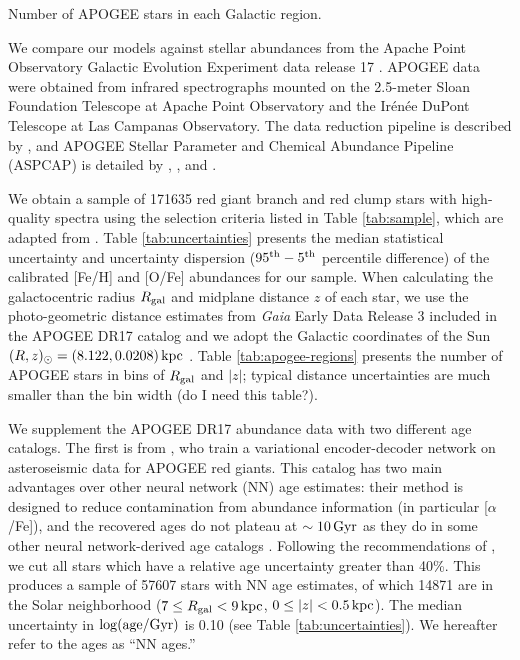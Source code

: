\documentclass[twocolumn,twocolappendix,linenumbers]{aastex631}
\newcommand{\todo}[1]{{\color{red}#1}}
\newcommand{\kpc}{\,{\rm kpc}}
\begin{document}
\begin{table}
\centering
\caption{Number of APOGEE stars in each Galactic region.}
\label{tab:apogee-regions}

\end{table}

We compare our models against stellar abundances from the Apache Point Observatory Galactic Evolution Experiment \citep[APOGEE;][]{majewski_apache_2017} data release 17 \citep[DR17;][]{abdurrouf_seventeenth_2022}. APOGEE data were obtained from infrared spectrographs \citep{wilson_apache_2019} mounted on the 2.5-meter Sloan Foundation Telescope \citep{gunn_25_2006} at Apache Point Observatory and the Ir{\'e}n{\'e}e DuPont Telescope \citep{bowen_optical_1973} at Las Campanas Observatory. The data reduction pipeline is described by \citet{nidever_data_2015}, and APOGEE Stellar Parameter and Chemical Abundance Pipeline (ASPCAP) is detailed by \citet{holtzman_abundances_2015}, \citet{garcia_perez_aspcap_2016}, and \citet{jonsson_apogee_2020}.

We obtain a sample of \num{171635} red giant branch and red clump stars with high-quality spectra using the selection criteria listed in Table \ref{tab:sample}, which are adapted from \citet{hayden_chemical_2015}. Table \ref{tab:uncertainties} presents the median statistical uncertainty and uncertainty dispersion ($95^{\rm th} - 5^{\rm th}$ percentile difference) of the calibrated [Fe/H] and [O/Fe] abundances for our sample. When calculating the galactocentric radius $R_{\rm gal}$ and midplane distance $z$ of each star, we use the \citet{bailer-jones_estimating_2021} photo-geometric distance estimates from {\it Gaia} Early Data Release 3 \citep{gaia_collaboration_gaia_2016,gaia_collaboration_gaia_2021} included in the APOGEE DR17 catalog and we adopt the Galactic coordinates of the Sun $(R,z)_\odot=(8.122, 0.0208)\kpc$ \citep{gravity_collaboration_detection_2018,bennett_vertical_2019}. Table \ref{tab:apogee-regions} presents the number of APOGEE stars in bins of $R_{\rm gal}$ and $|z|$; typical distance uncertainties are much smaller than the bin width \todo{(do I need this table?)}.

We supplement the APOGEE DR17 abundance data with two different age catalogs. The first is from \citet{leung_variational_2023}, who train a variational encoder-decoder network on asteroseismic data for APOGEE red giants. This catalog has two main advantages over other neural network (NN) age estimates: their method is designed to reduce contamination from abundance information (in particular [$\alpha$/Fe]), and the recovered ages do not plateau at $\sim10\,{\rm Gyr}$ as they do in some other neural network-derived age catalogs \citep[e.g.,][]{mackereth_dynamical_2019}. Following the recommendations of \citet{leung_variational_2023}, we cut all stars which have a relative age uncertainty greater than 40\%. This produces a sample of \num{57607} stars with NN age estimates, of which \num{14871} are in the Solar neighborhood ($7\leq R_{\rm gal}<9\kpc$, $0\leq|z|<0.5\kpc$). The median uncertainty in $\log({\rm age}/{\rm Gyr})$ is 0.10 (see Table \ref{tab:uncertainties}). We hereafter refer to the \citet{leung_variational_2023} ages as ``NN ages.''
\end{document}
